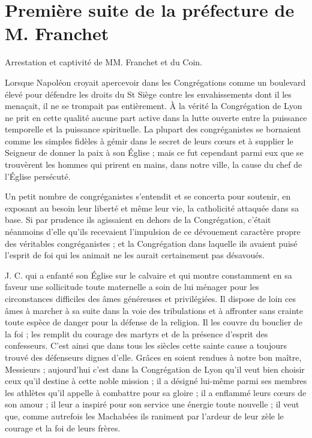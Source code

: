\chapter{Première suite de la préfecture de M. Franchet}
\begin{center}
Arrestation et captivité de MM. Franchet et du Coin.
\end{center}

Lorsque Napoléon croyait apercevoir dans les Congrégations comme un boulevard élevé pour défendre les droits du St Siège contre les envahissements dont il les menaçait, il ne se trompait pas entièrement. À la vérité la Congrégation de Lyon ne prit en cette qualité aucune part active dans la lutte ouverte
entre la puissance temporelle et la puissance spirituelle. La plupart des congréganistes se bornaient comme les simples fidèles à gémir dans le secret de leurs cœurs et à supplier le Seigneur de donner la paix à son Église ; mais ce fut cependant parmi eux que se trouvèrent les hommes qui prirent en mains, dans notre ville, la cause du chef de l'Église persécuté.

Un petit nombre de congréganistes s'entendit et se concerta pour soutenir, en exposant au besoin leur liberté et même leur vie, la catholicité attaquée dans sa base. Si par prudence ils agissaient en dehors de la Congrégation, c'était néanmoins d'elle qu'ils recevaient l'impulsion de ce dévouement caractère propre des véritables congréganistes ; et la Congrégation dans laquelle ils avaient puisé l'esprit de foi qui les animait ne les aurait certainement pas désavoués.

J. C. qui a enfanté son Église sur le calvaire et qui montre constamment en sa faveur une sollicitude toute maternelle a soin de lui ménager pour les circonstances difficiles des âmes généreuses et privilégiées. Il dispose de loin ces âmes à marcher à sa suite dans la voie des tribulations et à affronter sans crainte toute espèce de danger pour la défense de la religion. Il les couvre du bouclier de la foi ; les remplit du courage des martyrs et de la présence d'esprit des confesseurs. C'est ainsi que dans tous les siècles cette sainte cause a toujours trouvé des défenseurs dignes d'elle. Grâces en soient rendues à notre bon maître, Messieurs ; aujourd'hui c'est dans la Congrégation de Lyon qu'il veut bien choisir ceux qu'il destine à cette noble mission ; il a désigné lui-même parmi ses membres les athlètes qu'il appelle à combattre pour sa
gloire ; il a enflammé leurs cœurs de son amour ; il leur a inspiré pour son service une énergie toute nouvelle ; il veut que, comme autrefois les Machabées ils raniment par l'ardeur de leur zèle le courage et la foi de leurs frères.

